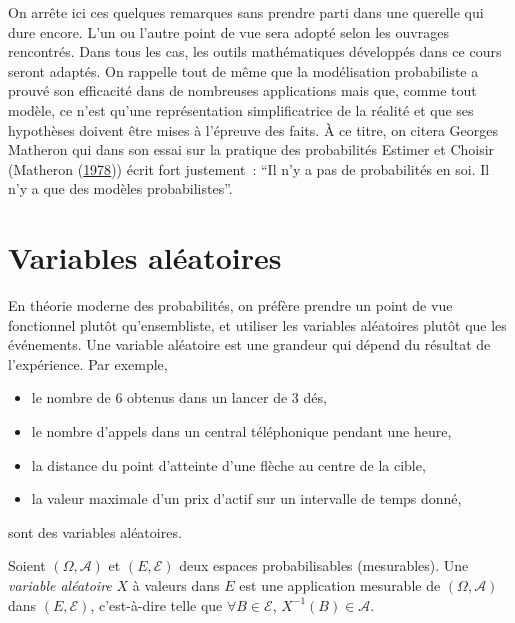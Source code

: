 On arrête ici ces quelques remarques sans prendre parti dans une
querelle qui dure encore. L'un ou l'autre point de vue sera adopté selon
les ouvrages rencontrés. Dans tous les cas, les outils mathématiques
développés dans ce cours seront adaptés. On rappelle tout de même que la
modélisation probabiliste a prouvé son efficacité dans de nombreuses
applications mais que, comme tout modèle, ce n'est qu'une représentation
simplificatrice de la réalité et que ses hypothèses doivent être mises à
l'épreuve des faits. À ce titre, on citera Georges Matheron qui dans son
essai sur la pratique des probabilités Estimer et Choisir (Matheron
(\protect\hyperlink{refI-matheron}{1978})) écrit fort justement~: ``Il
n'y a pas de probabilités en soi. Il n'y a que des modèles
probabilistes''.

\chapter{Variables aléatoires}\label{I-variables-aluxe9atoires-1}

En théorie moderne des probabilités, on préfère prendre un point de vue
fonctionnel plutôt qu'ensembliste, et utiliser les variables aléatoires
plutôt que les événements. Une variable aléatoire est une grandeur qui
dépend du résultat de l'expérience. Par exemple,

\begin{itemize}
\tightlist
\item
  le nombre de 6 obtenus dans un lancer de 3 dés,
\item
  le nombre d'appels dans un central téléphonique pendant une heure,
\item
  la distance du point d'atteinte d'une flèche au centre de la cible,
\item
  la valeur maximale d'un prix d'actif sur un intervalle de temps donné,
\end{itemize}

sont des variables aléatoires.

\begin{definition}\label{I-variable-aluxe9atoire}

Soient \((\Omega,\mathcal{A})\) et \((E,\mathcal{E})\) deux espaces
probabilisables (mesurables). Une \emph{variable aléatoire} \(X\) à
valeurs dans \(E\) est une application mesurable de
\((\Omega,\mathcal{A})\) dans \((E,\mathcal{E})\), c'est-à-dire telle
que \(\forall B \in \mathcal{E}\), \(X^{-1}(B) \in \mathcal{A}\).
\end{definition}

